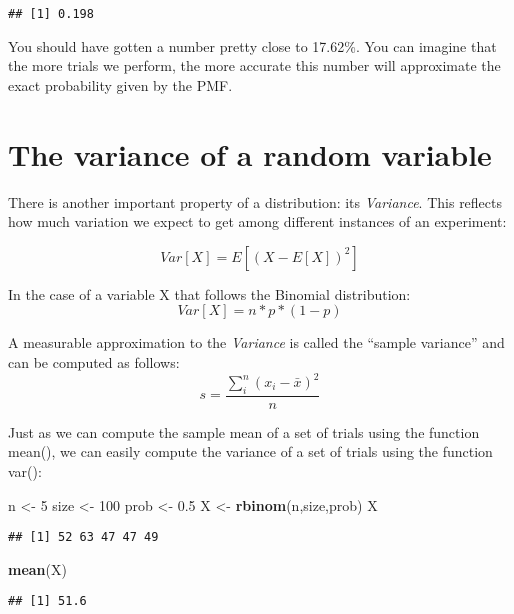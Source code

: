 \documentclass[
]{book}
\newenvironment{Shaded}{\begin{snugshade}}{\end{snugshade}}
\newcommand{\DecValTok}[1]{\textcolor[rgb]{0.00,0.00,0.81}{#1}}
\newcommand{\FloatTok}[1]{\textcolor[rgb]{0.00,0.00,0.81}{#1}}
\newcommand{\KeywordTok}[1]{\textcolor[rgb]{0.13,0.29,0.53}{\textbf{#1}}}
\newcommand{\NormalTok}[1]{#1}
\newcommand{\StringTok}[1]{\textcolor[rgb]{0.31,0.60,0.02}{#1}}
\begin{document}
\begin{verbatim}
## [1] 0.198
\end{verbatim}

You should have gotten a number pretty close to 17.62\%. You can imagine that the more trials we perform, the more accurate this number will approximate the exact probability given by the PMF.

\hypertarget{the-variance-of-a-random-variable}{%
\section{The variance of a random variable}\label{the-variance-of-a-random-variable}}

There is another important property of a distribution: its \emph{Variance}. This reflects how much variation we expect to get among different instances of an experiment:

\[Var[X] = E[(X-E[X])^{2}]\]

In the case of a variable X that follows the Binomial distribution: \[Var[X] = n * p * (1-p)\]

A measurable approximation to the \emph{Variance} is called the ``sample variance'' and can be computed as follows: \[s = \frac{\sum_{i}^{n}(x_{i} - \bar{x})^{2}}{n}\]

Just as we can compute the sample mean of a set of trials using the function mean(), we can easily compute the variance of a set of trials using the function var():

\begin{Shaded}
\begin{Highlighting}[]
\NormalTok{n \textless{}{-}}\StringTok{ }\DecValTok{5}
\NormalTok{size \textless{}{-}}\StringTok{ }\DecValTok{100}
\NormalTok{prob \textless{}{-}}\StringTok{ }\FloatTok{0.5}
\NormalTok{X \textless{}{-}}\StringTok{ }\KeywordTok{rbinom}\NormalTok{(n,size,prob)}
\NormalTok{X}
\end{Highlighting}
\end{Shaded}

\begin{verbatim}
## [1] 52 63 47 47 49
\end{verbatim}

\begin{Shaded}
\begin{Highlighting}[]
\KeywordTok{mean}\NormalTok{(X)}
\end{Highlighting}
\end{Shaded}

\begin{verbatim}
## [1] 51.6
\end{verbatim}
\end{document}
